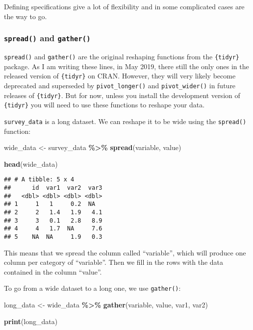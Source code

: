 \documentclass[
]{article}
\newenvironment{Shaded}{\begin{snugshade}}{\end{snugshade}}
\newcommand{\KeywordTok}[1]{\textcolor[rgb]{0.13,0.29,0.53}{\textbf{#1}}}
\newcommand{\NormalTok}[1]{#1}
\newcommand{\OperatorTok}[1]{\textcolor[rgb]{0.81,0.36,0.00}{\textbf{#1}}}
\newcommand{\StringTok}[1]{\textcolor[rgb]{0.31,0.60,0.02}{#1}}
\begin{document}
Defining specifications give a lot of flexibility and in some complicated cases are the way to go.

\hypertarget{spread-and-gather}{%
\subsubsection{\texorpdfstring{\texttt{spread()} and \texttt{gather()}}{spread() and gather()}}\label{spread-and-gather}}

\texttt{spread()} and \texttt{gather()} are the original reshaping functions from the \texttt{\{tidyr\}} package. As I am
writing these lines, in May 2019, there still the only ones in the released version of \texttt{\{tidyr\}} on
CRAN. However, they will very likely become deprecated and superseded by \texttt{pivot\_longer()} and
\texttt{pivot\_wider()} in future releases of \texttt{\{tidyr\}}. But for now, unless you install the development
version of \texttt{\{tidyr\}} you will need to use these functions to reshape your data.

\texttt{survey\_data} is a long dataset. We can reshape it to be wide using the \texttt{spread()} function:

\begin{Shaded}
\begin{Highlighting}[]
\NormalTok{wide\_data \textless{}{-}}\StringTok{ }\NormalTok{survey\_data }\OperatorTok{\%\textgreater{}\%}
\StringTok{  }\KeywordTok{spread}\NormalTok{(variable, value)}

\KeywordTok{head}\NormalTok{(wide\_data)}
\end{Highlighting}
\end{Shaded}

\begin{verbatim}
## # A tibble: 5 x 4
##      id  var1  var2  var3
##   <dbl> <dbl> <dbl> <dbl>
## 1     1   1     0.2  NA  
## 2     2   1.4   1.9   4.1
## 3     3   0.1   2.8   8.9
## 4     4   1.7  NA     7.6
## 5    NA  NA     1.9   0.3
\end{verbatim}

This means that we spread the column called ``variable'', which will produce one column per category
of ``variable''. Then we fill in the rows with the data contained in the column ``value''.

To go from a wide dataset to a long one, we use \texttt{gather()}:

\begin{Shaded}
\begin{Highlighting}[]
\NormalTok{long\_data \textless{}{-}}\StringTok{ }\NormalTok{wide\_data }\OperatorTok{\%\textgreater{}\%}
\StringTok{  }\KeywordTok{gather}\NormalTok{(variable, value, var1, var2)}

\KeywordTok{print}\NormalTok{(long\_data)}
\end{Highlighting}
\end{Shaded}
\end{document}
